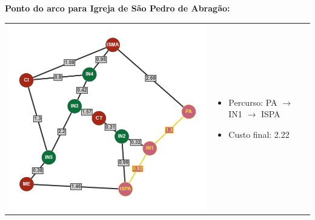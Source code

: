 \documentclass[12pt]{article}
\begin{document}
    \noindent \textbf{Ponto do arco para Igreja de São Pedro de Abragão:}\\
    \begin{tabular}{@{}m{}m{}@{}}
      \centering\includegraphics[scale=0.4]{anexos/PA-ISPA.png} &
      \begin{itemize}
        \item Percurso: PA $\rightarrow$ IN1 $\rightarrow$ ISPA
        \item Custo final: 2.22
      \end{itemize}
    \end{tabular} 
    
\end{document}
